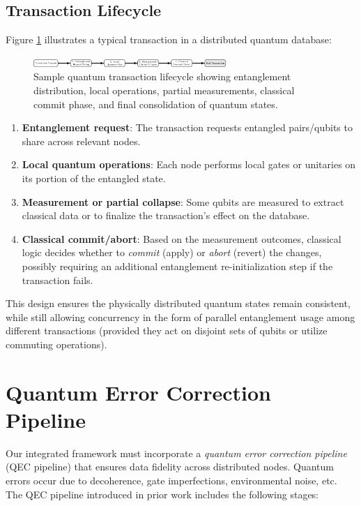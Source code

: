 \documentclass[11pt]{article}
\begin{document}
\subsection{Transaction Lifecycle}
Figure \ref{fig:qdb_transaction_flow} illustrates a typical transaction in a distributed quantum database:

\begin{figure}[H]
    \centering
    \includegraphics[width=0.65\textwidth]{qdb_trans_flow_fig.png}
    \caption{Sample quantum transaction lifecycle showing entanglement distribution, local operations, partial measurements, classical commit phase, and final consolidation of quantum states.}
    \label{fig:qdb_transaction_flow}
\end{figure}

\begin{enumerate}
    \item \textbf{Entanglement request}: The transaction requests entangled pairs/qubits to share across relevant nodes.
    \item \textbf{Local quantum operations}: Each node performs local gates or unitaries on its portion of the entangled state.
    \item \textbf{Measurement or partial collapse}: Some qubits are measured to extract classical data or to finalize the transaction’s effect on the database.
    \item \textbf{Classical commit/abort}: Based on the measurement outcomes, classical logic decides whether to \emph{commit} (apply) or \emph{abort} (revert) the changes, possibly requiring an additional entanglement re-initialization step if the transaction fails.
\end{enumerate}

This design ensures the physically distributed quantum states remain consistent, while still allowing concurrency in the form of parallel entanglement usage among different transactions (provided they act on disjoint sets of qubits or utilize commuting operations).

\section{Quantum Error Correction Pipeline}
\label{sec:qec_pipeline}
Our integrated framework must incorporate a \emph{quantum error correction pipeline} (QEC pipeline) that ensures data fidelity across distributed nodes. Quantum errors occur due to decoherence, gate imperfections, environmental noise, etc. The QEC pipeline introduced in prior work includes the following stages:
\end{document}
